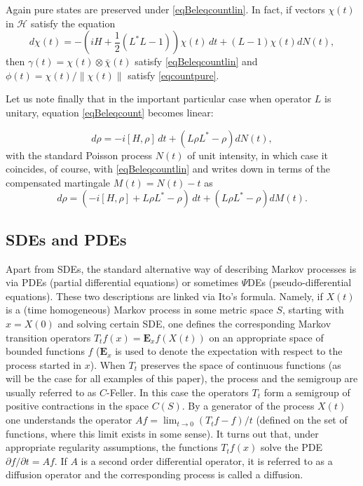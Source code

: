 \documentclass[12pt]{article}
\def\HC{\mathcal{H}}
\def\E{\mathbf{E}}
\def\pa{\partial}
\def\ga{\gamma}
\begin{document}
Again pure states are preserved under \eqref{eqBeleqcountlin}.
In fact, if vectors $\chi(t)$ in $\HC$ satisfy the equation
\begin{equation}
\label{eqcountpurelinpu}
d \chi(t)=-\left(iH +\frac12 (L^*L-1)\right)\chi(t) \, dt
+(L-1)\chi(t)  dN(t),
\end{equation}
then $\ga(t)=\chi(t)\otimes \bar \chi(t)$ satisfy \eqref{eqBeleqcountlin}
 and $\phi(t)=\chi(t)/\|\chi(t)\|$ satisfy  \eqref{eqcountpure}.

Let us note finally that in the important particular case when operator $L$ is unitary,
equation \eqref{eqBeleqcount} becomes linear:

 \begin{equation}
\label{eqBeleqcountunit}
d\rho=- i[H, \rho]  \, dt
+\left(L\rho L^*-\rho\right) dN(t),
\end{equation}
with the standard Poisson process $N(t)$ of unit intensity, in which case it coincides, of course,
with \eqref{eqBeleqcountlin} and writes down in terms of the compensated martingale $M(t)=N(t)-t$ as
 \begin{equation}
\label{eqBeleqcountunit1}
d\rho=(- i[H, \rho] + L\rho L^*-\rho ) \, dt
+\left(L\rho L^*-\rho\right) dM(t).
\end{equation}

\subsection{SDEs and PDEs}

Apart from SDEs, the standard alternative way of describing Markov processes
is via PDEs (partial differential equations) or sometimes $\Psi$DEs (pseudo-differential equations).
  These two descriptions are linked via Ito's
formula. Namely, if $X(t)$ is a (time homogeneous) Markov process in some metric space $S$,
starting with $x=X(0)$ and solving
certain SDE, one defines the corresponding Markov transition operators  $T_tf(x)=\E_x f(X(t))$ on an
appropriate space of bounded functions $f$ ($\E_x$ is used to denote the
expectation with respect to the process started in $x$).
When $T_t$ preserves the space of continuous
functions (as will be the case for all examples of this paper), the process and the semigroup
are usually referred to as $C$-Feller. In this case the operators $T_t$ form a semigroup of positive
contractions in the space $C(S)$. By a generator
of the process $X(t)$ one understands the operator $Af=\lim_{t\to 0} (T_tf-f)/t$ (defined on the set of functions,
where this limit exists in some sense). It turns out that, under appropriate regularity assumptions,
the functions $T_tf(x)$ solve the PDE $\pa f/\pa t=Af$. If $A$ is a second order differential operator,
it is referred to as a diffusion operator and the corresponding process is called a diffusion.
\end{document}
